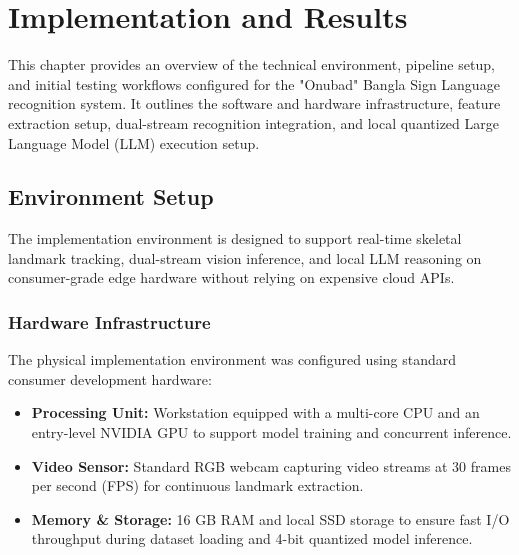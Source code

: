\chapter{Implementation and Results}
This chapter provides an overview of the technical environment, pipeline setup, and initial testing workflows configured for the "Onubad" Bangla Sign Language recognition system. It outlines the software and hardware infrastructure, feature extraction setup, dual-stream recognition integration, and local quantized Large Language Model (LLM) execution setup.

\section{Environment Setup}
The implementation environment is designed to support real-time skeletal landmark tracking, dual-stream vision inference, and local LLM reasoning on consumer-grade edge hardware without relying on expensive cloud APIs.

\subsection{Hardware Infrastructure}
The physical implementation environment was configured using standard consumer development hardware:
\begin{itemize}
\item \textbf{Processing Unit:} Workstation equipped with a multi-core CPU and an entry-level NVIDIA GPU to support model training and concurrent inference.
\item \textbf{Video Sensor:} Standard RGB webcam capturing video streams at 30 frames per second (FPS) for continuous landmark extraction.
\item \textbf{Memory & Storage:} 16 GB RAM and local SSD storage to ensure fast I/O throughput during dataset loading and 4-bit quantized model inference.
\end{itemize}

